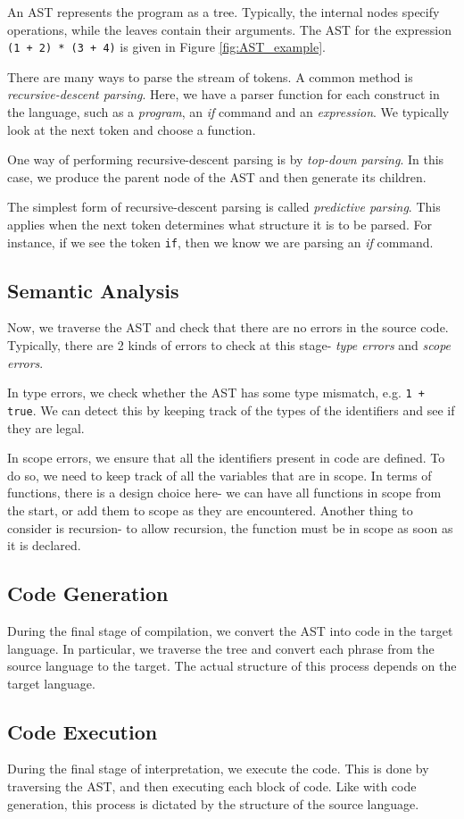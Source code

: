 An AST represents the program as a tree. Typically, the internal nodes specify operations, while the leaves contain their arguments. The AST for the expression \texttt{(1 + 2) * (3 + 4)} is given in Figure \ref{fig:AST_example}.

There are many ways to parse the stream of tokens. A common method is \emph{recursive-descent parsing}. Here, we have a parser function for each construct in the language, such as a \textit{program}, an \textit{if} command and an \textit{expression}. We typically look at the next token and choose a function. 

One way of performing recursive-descent parsing is by \emph{top-down parsing}. In this case, we produce the parent node of the AST and then generate its children. 

The simplest form of recursive-descent parsing is called \emph{predictive parsing}. This applies when the next token determines what structure it is to be parsed. For instance, if we see the token \texttt{if}, then we know we are parsing an \textit{if} command.

\subsection{Semantic Analysis}
Now, we traverse the AST and check that there are no errors in the source code. Typically, there are 2 kinds of errors to check at this stage- \emph{type errors} and \emph{scope errors}. 

In type errors, we check whether the AST has some type mismatch, e.g. \texttt{1 + true}. We can detect this by keeping track of the types of the identifiers and see if they are legal.

In scope errors, we ensure that all the identifiers present in code are defined. To do so, we need to keep track of all the variables that are in scope. In terms of functions, there is a design choice here- we can have all functions in scope from the start, or add them to scope as they are encountered. Another thing to consider is recursion- to allow recursion, the function must be in scope as soon as it is declared.

\subsection{Code Generation}
During the final stage of compilation, we convert the AST into code in the target language. In particular, we traverse the tree and convert each phrase from the source language to the target. The actual structure of this process depends on the target language.

\subsection{Code Execution}
During the final stage of interpretation, we execute the code. This is done by traversing the AST, and then executing each block of code. Like with code generation, this process is dictated by the structure of the source language.
